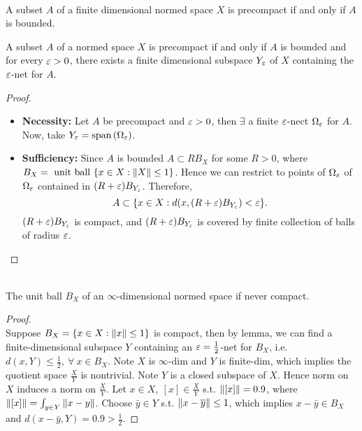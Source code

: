 \vspace{3pt}
\begin{theorem}\ \\
A subset $A$ of a finite dimensional normed space $X$ is precompact if and only if $A$ is bounded.
\end{theorem}


\vspace{3pt}
\begin{lemma}
A subset $A$ of a normed space $X$ is precompact if and only if $A$ is bounded and for every $\varepsilon > 0$, there exists a finite dimensional subspace $Y_\varepsilon$ of $X$ containing the $\varepsilon$-net for $A$.
\end{lemma}
\begin{proof}\ 
\begin{itemize}
    \item \textbf{Necessity:}
    Let $A$ be precompact and $\varepsilon > 0$, then $\exists$ a finite $\varepsilon$-nect $\Omega_\varepsilon$ for $A$. Now, take $Y_\varepsilon = \operatorname{span}\left(\Omega_\varepsilon\right)$.
    \item \textbf{Sufficiency:} Since $A$ is bounded $A \subset R B_X$ for some $R > 0$, where $B_X = \text{ unit ball } \{x \in X:\norm{X} \leq 1\}$. Hence we can restrict to points of $\Omega_\varepsilon$ of $\Omega_\varepsilon$ contained in $(R + \varepsilon) B_{Y_\varepsilon}$. Therefore,
    \begin{equation*}
        A \subset \{x \in X: d(x, (R + \varepsilon) B_{Y_\varepsilon}) < \varepsilon\}.
    \end{equation*}
    $(R + \varepsilon) B_{Y_\varepsilon}$ is compact, and $(R+\varepsilon)B_{Y_\varepsilon}$ is covered by finite collection of balls of radius $\varepsilon$.
\end{itemize}
\end{proof}


\vspace{3pt}
\begin{theorem}[F. Riesz]\ \\
The unit ball $B_X$ of an $\infty$-dimensional normed space if never compact.
\end{theorem}
\begin{proof}\ \\
Suppose $B_X = \{x \in X: \norm{x} \leq 1\}$ is compact, then by lemma, we can find a finite-dimensional subspace $Y$ containing an $\varepsilon = \frac{1}{2}$-net for $B_X$, i.e. $d(x,Y) \leq \frac{1}{2},\ \forall\ x \in B_X$. Note $X$ is $\infty$-dim and $Y$ is finite-dim, which implies the quotient space $\frac{X}{Y}$ is nontrivial. Note $Y$ is a closed subspace of $X$. Hence norm on $X$ induces a norm on $\frac{X}{Y}$. Let $x \in X,\ [x] \in \frac{X}{Y}$ s.t. $\norm{[x]} = 0.9$, where $\norm{[x]} = \int_{y \in Y} \norm{x - y}$. Choose $\bar{y} \in Y$ s.t. $\norm{x - \overline{y}} \leq 1$, which implies $x - \bar{y} \in B_X$ and $d(x - \bar{y},Y) = 0.9 > \frac12$.
\end{proof}






